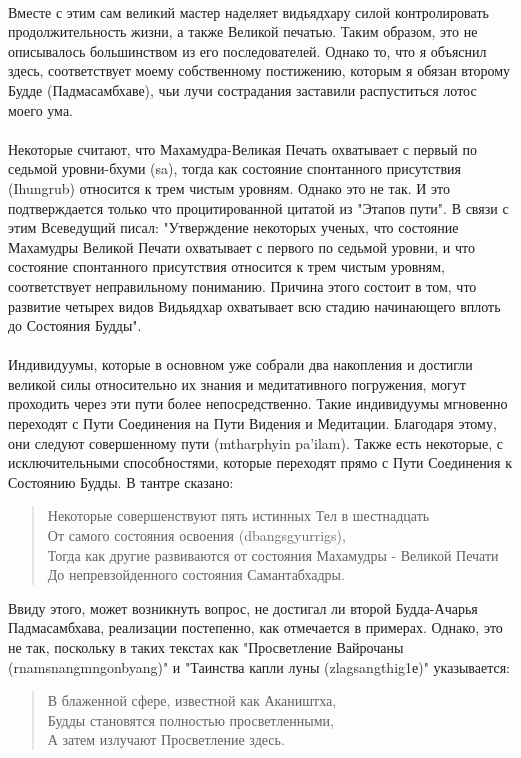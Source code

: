 \\
Вместе с этим сам великий мастер наделяет видьядхару силой контролировать 
продолжительность жизни, а также Великой печатью. Таким образом, это не описывалось
большинством из его последователей. Однако то, что я объяснил здесь, соответствует моему 
собственному постижению, которым я обязан второму Будде (Падмасамбхаве), чьи лучи 
сострадания заставили распуститься лотос моего ума. \\
\\
Некоторые считают, что Махамудра-Великая Печать охватывает с первый по 
седьмой уровни-бхуми (sa), тогда как состояние спонтанного присутствия (Ihungrub) 
относится к трем чистым уровням. Однако это не так. И это подтверждается только что 
процитированной цитатой из "Этапов пути". В связи с этим Всеведущий писал: 
"Утверждение некоторых ученых, что состояние Махамудры Великой Печати охватывает с 
первого по седьмой уровни, и что состояние спонтанного присутствия относится к трем 
чистым уровням, соответствует неправильному пониманию. Причина этого состоит в том, 
что развитие четырех видов Видьядхар охватывает всю стадию начинающего вплоть до 
Состояния Будды". \\
\\
Индивидуумы, которые в основном уже собрали два накопления и достигли великой 
силы относительно их знания и медитативного погружения, могут проходить через эти пути 
более непосредственно. Такие индивидуумы мгновенно переходят с Пути Соединения на 
Пути Видения и Медитации. Благодаря этому, они следуют совершенному пути (mtharphyin
pa'ilam). Также есть некоторые, с исключительными способностями, которые переходят 
прямо с Пути Соединения к Состоянию Будды. В тантре сказано:
\begin{verse}
Некоторые совершенствуют пять истинных Тел в шестнадцать\\
От самого состояния освоения (dbangsgyurrigs),\\
Тогда как другие развиваются от состояния Махамудры - Великой Печати\\
До непревзойденного состояния Самантабхадры.
\end{verse}
Ввиду этого, может возникнуть вопрос, не достигал ли второй Будда-Ачарья
Падмасамбхава, реализации постепенно, как отмечается в примерах. Однако, это не так, 
поскольку в таких текстах как "Просветление Вайрочаны (rnamsnangmngonbyang)" и 
"Таинства капли луны (zlagsangthig1е)" указывается:
\begin{verse}
В блаженной сфере, известной как Акаништха,\\
Будды становятся полностью просветленными,\\
А затем излучают Просветление здесь.
\end{verse}
